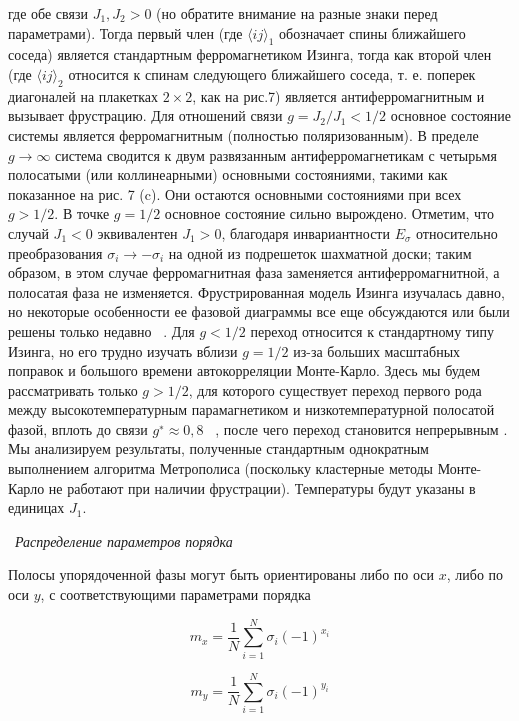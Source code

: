 \documentclass[11pt]{article}
\begin{document}
где обе связи $J_1, J_2 > 0$ (но обратите внимание на разные знаки перед параметрами).
Тогда первый член (где $\langle ij \rangle _1$ обозначает спины ближайшего соседа) является стандартным ферромагнетиком Изинга, тогда как второй член (где $\langle ij \rangle _2$ относится к спинам следующего ближайшего соседа, т. е. поперек диагоналей на плакетках $2 × 2$, как на рис.7) является антиферромагнитным и вызывает фрустрацию. Для отношений связи $g = J_2 / J_1 <1/2$ основное состояние системы является ферромагнитным (полностью поляризованным). В пределе $g → ∞$ система сводится к двум развязанным антиферромагнетикам с четырьмя полосатыми (или коллинеарными) основными состояниями, такими как показанное на рис. 7 (c). Они остаются основными состояниями при всех $g> 1/2$. В точке $g = 1/2$ основное состояние сильно вырождено. Отметим, что случай $J_1 <0$ эквивалентен $J_1> 0$, благодаря инвариантности $E_\sigma$  относительно преобразования $\sigma_i → -\sigma_i$ на одной из подрешеток шахматной доски; таким образом, в этом случае ферромагнитная фаза заменяется антиферромагнитной, а полосатая фаза не изменяется.
Фрустрированная модель Изинга изучалась давно, но некоторые особенности ее фазовой диаграммы все еще обсуждаются или были решены только недавно ~\cite{pre_80_051117, phys_145_012051, prl_108_045702}. Для $g <1/2$ переход относится к стандартному типу Изинга, но его трудно изучать вблизи $g = 1/2$ из-за больших масштабных поправок и большого времени автокорреляции Монте-Карло. Здесь мы будем рассматривать только $g> 1/2$, для которого существует переход первого рода между высокотемпературным парамагнетиком и низкотемпературной полосатой фазой, вплоть до связи $g^{∗} \approx 0,8$ ~\cite{prl_108_045702}, после чего переход становится непрерывным . Мы анализируем результаты, полученные стандартным однократным выполнением алгоритма Метрополиса (поскольку кластерные методы Монте-Карло не работают при наличии фрустрации). Температуры будут указаны в единицах $J_1$.

~\emph{Распределение параметров порядка}

Полосы упорядоченной фазы могут быть ориентированы либо по оси $x$, либо по оси $y$, с соответствующими параметрами порядка

\begin{equation}
m_x=\frac{1}{N}\sum\limits_{i=1}^N \sigma_i(-1)^{x_i}
\label{eq_80}
\end{equation}

\begin{equation*}
m_y=\frac{1}{N}\sum\limits_{i=1}^N \sigma_i(-1)^{y_i}
\end{equation*}
\end{document}
